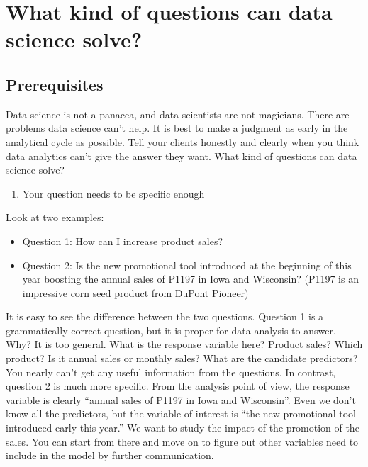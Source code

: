 \documentclass[12pt,]{krantz}
\providecommand{\tightlist}{%
  \setlength{\itemsep}{0pt}\setlength{\parskip}{0pt}}
\theoremstyle{definition}
\theoremstyle{definition}
\theoremstyle{definition}
\theoremstyle{remark}
\begin{document}
\section{What kind of questions can data science
solve?}\label{what-kind-of-questions-can-data-science-solve}

\subsection{Prerequisites}\label{prerequisites}

Data science is not a panacea, and data scientists are not magicians.
There are problems data science can't help. It is best to make a
judgment as early in the analytical cycle as possible. Tell your clients
honestly and clearly when you think data analytics can't give the answer
they want. What kind of questions can data science solve?

\begin{enumerate}
\def\labelenumi{\arabic{enumi}.}
\tightlist
\item
  Your question needs to be specific enough
\end{enumerate}

Look at two examples:

\begin{itemize}
\tightlist
\item
  Question 1: How can I increase product sales?
\item
  Question 2: Is the new promotional tool introduced at the beginning of
  this year boosting the annual sales of P1197 in Iowa and Wisconsin?
  (P1197 is an impressive corn seed product from DuPont Pioneer)
\end{itemize}

It is easy to see the difference between the two questions. Question 1
is a grammatically correct question, but it is proper for data analysis
to answer. Why? It is too general. What is the response variable here?
Product sales? Which product? Is it annual sales or monthly sales? What
are the candidate predictors? You nearly can't get any useful
information from the questions. In contrast, question 2 is much more
specific. From the analysis point of view, the response variable is
clearly ``annual sales of P1197 in Iowa and Wisconsin''. Even we don't
know all the predictors, but the variable of interest is ``the new
promotional tool introduced early this year.'' We want to study the
impact of the promotion of the sales. You can start from there and move
on to figure out other variables need to include in the model by further
communication.
\end{document}
